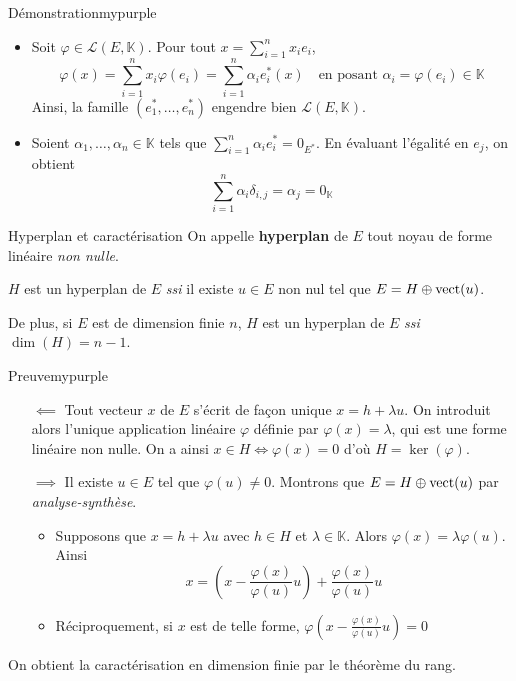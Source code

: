     \begin{demo}{Démonstration}{mypurple}
        \begin{itemize}
            \item Soit $\varphi \in \mathcal{L}(E,\mathbb{K})$. Pour tout $x = \sum_{i=1}^{n} x_i e_i$, 
            \[ \varphi(x) = \sum_{i=1}^{n} x_i \varphi(e_i) = \sum_{i=1}^{n} \alpha_i e_i^*(x) \quad \text{en posant } \alpha_i = \varphi(e_i) \in \mathbb{K} \]    
            Ainsi, la famille $(e_1^*, \ldots, e_n^*)$ engendre bien $\mathcal{L}(E,\mathbb{K})$.
            \item Soient $\alpha_1,\ldots,\alpha_n \in \mathbb{K}$ tels que $\sum_{i=1}^{n} \alpha_i e_i^* = 0_{E^*}$. En évaluant l’égalité en $e_j$, on obtient 
            \[ \sum_{i=1}^{n} \alpha_i \delta_{i,j} = \alpha_j = 0_{\mathbb{K}} \]   
        \end{itemize}
    \end{demo}

    \begin{defitheo}{Hyperplan et caractérisation}{}
        On appelle \textbf{hyperplan} de $E$ tout noyau de forme linéaire \textit{non nulle}. 

        $H$ est un hyperplan de $E$ \textit{ssi} il existe $u \in E$ non nul tel que $E = H \oplus \operatorname{vect}(u)$.

        De plus, si $E$ est de dimension finie $n$, $H$ est un hyperplan de $E$ \textit{ssi} $\dim(H) = n-1$.
    \end{defitheo}

    \begin{demo}{Preuve}{mypurple}
        \begin{itemize}
            \item[\textcolor{mypurple}{$\impliedby$}] Tout vecteur $x$ de $E$ s’écrit de façon unique $x = h + \lambda u$. On introduit alors l’unique application linéaire $\varphi$ définie par $\varphi(x) = \lambda$, qui est une forme linéaire non nulle. On a ainsi $x \in H \iff \varphi(x) = 0$ d’où $H = \ker(\varphi)$.
            \item[\textcolor{mypurple}{$\implies$}] Il existe $u \in E$ tel que $\varphi(u) \neq 0$.  Montrons que $E = H \oplus \operatorname{vect}(u)$ par \textit{analyse-synthèse}.
            \begin{itemize}
                \item Supposons que $x = h + \lambda u$ avec $h \in H$ et $\lambda \in \mathbb{K}$. Alors $\varphi(x) = \lambda \varphi(u)$. Ainsi 
                \[ x = \left( x - \frac{\varphi(x)}{\varphi(u)}u \right) + \frac{\varphi(x)}{\varphi(u)}u \]    
                \item Réciproquement, si $x$ est de telle forme, $\varphi\left( x - \frac{\varphi(x)}{\varphi(u)}u \right) = 0$ 
            \end{itemize}
        \end{itemize}
        On obtient la caractérisation en dimension finie par le théorème du rang.
    \end{demo}
    
